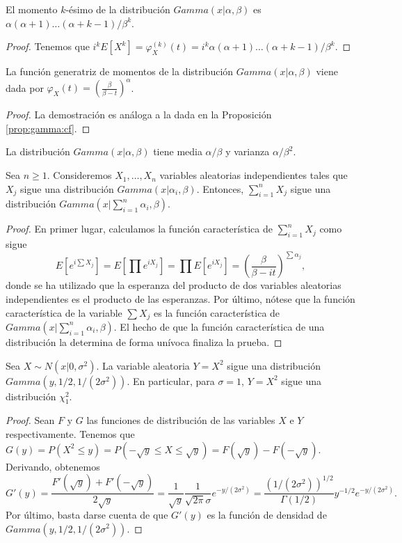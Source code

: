 \begin{cor}
    El momento $k$-ésimo de la distribución $Gamma(x|\alpha,\beta)$ es $\alpha (\alpha+1) \ldots (\alpha + k -1) / \beta^k$.
\end{cor}
\begin{proof}
    Tenemos que $i^k E[X^k]= \varphi_X^{(k)}(t) = i^k \alpha (\alpha+1) \ldots (\alpha + k -1) / \beta^k$.
\end{proof}

\begin{prop}
    La función generatriz de momentos de la distribución $Gamma(x|\alpha, \beta)$ viene dada por $\varphi_X(t) = \left(\frac{\beta}{\beta - t}\right)^\alpha$.
\end{prop}
\begin{proof}
    La demostración es análoga a la dada en la Proposición \ref{prop:gamma:cf}.
\end{proof}

\begin{cor}
    La distribución $Gamma(x|\alpha,\beta)$ tiene media $\alpha / \beta$ y varianza $\alpha / \beta^2$.
\end{cor}

\begin{prop}
    Sea $n \ge 1$. Consideremos $X_1, \ldots, X_n$ variables aleatorias independientes tales que $X_j$ sigue una distribución $Gamma(x|\alpha_i, \beta)$. Entonces, $\sum_{i=1}^n X_j$ sigue una distribución $Gamma(x|\sum_{i=1}^n \alpha_i, \beta)$.
\end{prop}
\begin{proof}
    En primer lugar, calculamos la función característica de $\sum_{i=1}^n X_j$ como sigue
    \[E[e^{i\sum X_j}] = E[\prod e^{iX_j}] = \prod E[e^{iX_j}] = \left(\frac{\beta}{\beta - it}\right)^{\sum \alpha_j},\]
    donde se ha utilizado que la esperanza del producto de dos variables aleatorias independientes es el producto de las esperanzas. Por último, nótese que la función característica de la variable $\sum X_j$ es la función característica de $Gamma(x|\sum_{i=1}^n \alpha_i, \beta)$. El hecho de que la función característica de una distribución la determina de forma unívoca finaliza la prueba.
\end{proof}

\begin{prop} \label{prop:normal-square}
    Sea $X \sim N(x|0,\sigma^2)$. La variable aleatoria $Y = X^2$ sigue una distribución \\ $Gamma(y,1/2,1/(2\sigma^2))$. En particular, para $\sigma = 1$, $Y = X^2$ sigue una distribución $\chi^2_1$.
\end{prop}
\begin{proof}
    Sean $F$ y $G$ las funciones de distribución de las variables $X$ e $Y$ respectivamente. Tenemos que $G(y) = P(X^2 \le y) = P(- \sqrt{y} \le X \le \sqrt{y}) = F(\sqrt{y}) - F(-\sqrt{y})$. Derivando, obtenemos
    \[G'(y) = \frac{F'(\sqrt{y}) + F'(-\sqrt{y})}{2\sqrt{y}} = \frac{1}{\sqrt{y}} \frac{1}{\sqrt{2\pi}\sigma} e^{-y/(2\sigma^2)} = \frac{(1/(2\sigma^2))^{1/2}}{\Gamma(1/2)} y^{-1/2} e^{-y/(2\sigma^2)}.\]
    Por último, basta darse cuenta de que $G'(y)$ es la función de densidad de $Gamma(y,1/2,1/(2\sigma^2))$.
\end{proof}

